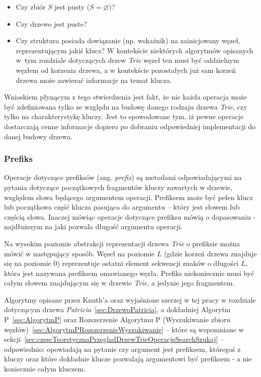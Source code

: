 		\begin{itemize}
			\item Czy zbiór $S$ jest pusty ($S=\varnothing$)?
			\item Czy drzewo jest puste? 
			\item Czy struktura posiada dowiązanie (np. wskaźnik) na zainicjowany węzeł, reprezentującym jakiś klucz? W kontekście niektórych algorytmów opisanych w~tym rozdziale dotyczących drzew \emph{Trie} węzeł ten musi być oddzielnym węzłem od korzenia drzewa, a w kontekście pozostałych już sam korzeń drzewa może zawierać informacje na temat klucza.
		\end{itemize} 
		
		Wnioskiem płynącym z tego stwierdzenia jest fakt, że nie każda operacja może być zdefiniowana tylko ze względu na budowę danego rodzaju drzewa \emph{Trie}, czy tylko na charakterystykę kluczy. Jest to spowodowane tym, iż pewne operacje dostarczają cenne informacje dopiero po dobraniu odpowiedniej implementacji do danej budowy drzewa.
		
		\subsubsection{Prefiks}\label{sec:czescTeoretycznaPrzegladDrzewTrieOperacjePrefix}
		
		Operacje dotyczące prefiksów (ang. \emph{prefix}) są metodami odpowiadającymi na pytania dotyczące początkowych fragmentów kluczy zawartych w drzewie, względem słowa będącego argumentem operacji. Prefiksem może być pełen klucz lub początkowa część klucza pasująca do argumentu -- który jest słowem lub częścią słowa. Inaczej mówiąc operacje dotyczące prefiksu mówią o dopasowaniu - najdłuższym na jaki pozwala długość argumentu operacji.
		
        Na wysokim poziomie abstrakcji reprezentacji drzewa \emph{Trie} o prefiksie można mówić w następujący sposób. Węzeł na poziomie $L$ (gdzie korzeń drzewa znajduje się na poziomie 0) reprezentuje ostatni element sekwencji znaków o długości $L$, która jest nazywana prefiksem omawianego węzła. Prefiks niekoniecznie musi być całym słowem znajdującym się w drzewie \emph{Trie}, a jedynie jego fragmentem.
		
		Algorytmy opisane przez Knuth'a oraz wyjaśnione szerzej w tej pracy w rozdziale dotyczącym drzewa \emph{Patricia}~\ref{sec:DrzewoPatricia}, a dokładniej Algorytm P~\ref{sec:AlgorytmP} oraz Rozszerzenie Algorytmu P (Wyszukiwanie zbioru węzłów)~\ref{sec:AlgorytmPRozszerzenieWyszukiwanie} -- które są wspomniane w sekcji~\ref{sec:czescTeoretycznaPrzegladDrzewTrieOperacjeSearchSzukaj} -- odpowiednio: opowiadają na pytanie czy argument jest prefiksem, któregoś z kluczy oraz które dokładnie klucze pozwalają argumentowi być prefiksem - a nie koniecznie całym kluczem.
		
